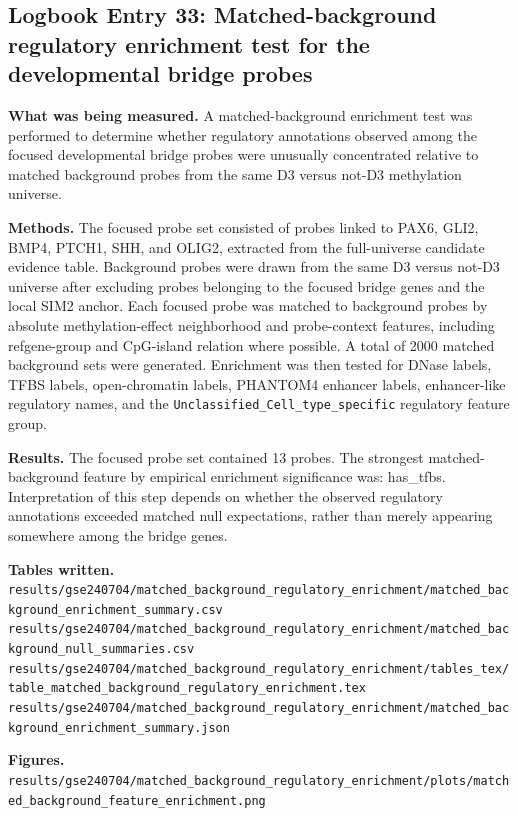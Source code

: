 \subsection*{Logbook Entry 33: Matched-background regulatory enrichment test for the developmental bridge probes}

\textbf{What was being measured.}
A matched-background enrichment test was performed to determine whether regulatory annotations observed among the focused developmental bridge probes were unusually concentrated relative to matched background probes from the same D3 versus not-D3 methylation universe.

\textbf{Methods.}
The focused probe set consisted of probes linked to PAX6, GLI2, BMP4, PTCH1, SHH, and OLIG2, extracted from the full-universe candidate evidence table. Background probes were drawn from the same D3 versus not-D3 universe after excluding probes belonging to the focused bridge genes and the local SIM2 anchor. Each focused probe was matched to background probes by absolute methylation-effect neighborhood and probe-context features, including refgene-group and CpG-island relation where possible. A total of 2000 matched background sets were generated. Enrichment was then tested for DNase labels, TFBS labels, open-chromatin labels, PHANTOM4 enhancer labels, enhancer-like regulatory names, and the \texttt{Unclassified\_Cell\_type\_specific} regulatory feature group.

\textbf{Results.}
The focused probe set contained 13 probes. The strongest matched-background feature by empirical enrichment significance was: has\_tfbs. Interpretation of this step depends on whether the observed regulatory annotations exceeded matched null expectations, rather than merely appearing somewhere among the bridge genes.

\textbf{Tables written.}
\texttt{results/gse240704/matched\_background\_regulatory\_enrichment/matched\_background\_enrichment\_summary.csv}\\
\texttt{results/gse240704/matched\_background\_regulatory\_enrichment/matched\_background\_null\_summaries.csv}\\
\texttt{results/gse240704/matched\_background\_regulatory\_enrichment/tables\_tex/table\_matched\_background\_regulatory\_enrichment.tex}\\
\texttt{results/gse240704/matched\_background\_regulatory\_enrichment/matched\_background\_enrichment\_summary.json}

\textbf{Figures.}
\texttt{results/gse240704/matched\_background\_regulatory\_enrichment/plots/matched\_background\_feature\_enrichment.png}

